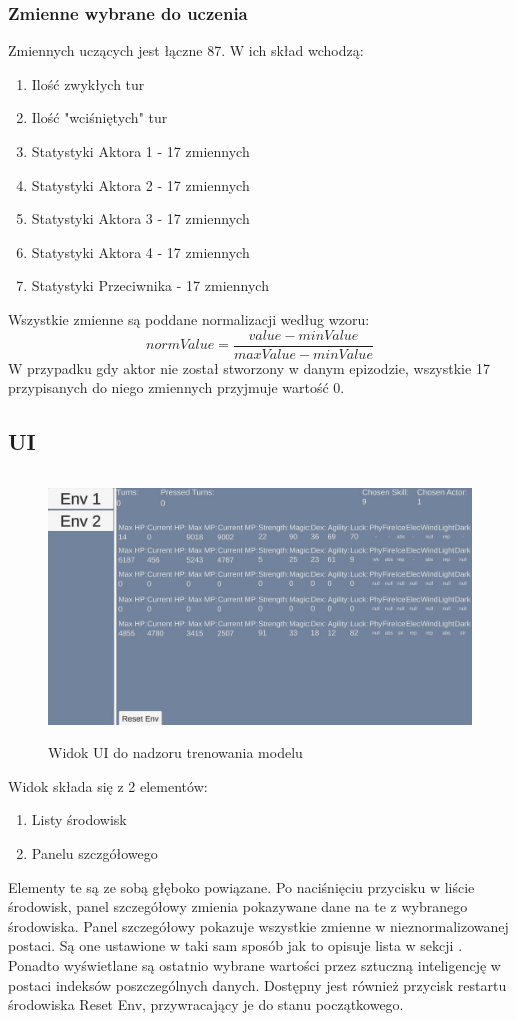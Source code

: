 \documentclass{SGGW-thesis}
\begin{document}
\subsubsection{Zmienne wybrane do uczenia}
\label{zmienne}
Zmiennych uczących jest łączne 87. W ich skład wchodzą:
\begin{enumerate}
  \item{Ilość zwykłych tur}
  \item{Ilość "wciśniętych" tur}
  \item{Statystyki Aktora 1 - 17 zmiennych}
  \item{Statystyki Aktora 2 - 17 zmiennych}
  \item{Statystyki Aktora 3 - 17 zmiennych}
  \item{Statystyki Aktora 4 - 17 zmiennych}
  \item{Statystyki Przeciwnika - 17 zmiennych}
\end{enumerate}
Wszystkie zmienne są poddane normalizacji według wzoru:
\[normValue = \frac{value-minValue}{maxValue-minValue}\]
W przypadku gdy aktor nie został stworzony w danym epizodzie, wszystkie 17 przypisanych do niego zmiennych przyjmuje wartość 0.
\subsection{UI}
\begin{figure}[H]
  \centering
  \includegraphics[height=7cm]{trainingui.JPG}
  \caption{Widok UI do nadzoru trenowania modelu}
\end{figure}
Widok składa się z 2 elementów:
\begin{enumerate}
  \item{Listy środowisk}
  \item{Panelu szczgółowego}
\end{enumerate}
Elementy te są ze sobą głęboko powiązane. Po naciśnięciu przycisku w liście środowisk, panel szczegółowy zmienia pokazywane dane na te z wybranego środowiska.
Panel szczegółowy pokazuje wszystkie zmienne w nieznormalizowanej postaci. Są one ustawione w taki sam sposób jak to opisuje lista w sekcji .
Ponadto wyświetlane są ostatnio wybrane wartości przez sztuczną inteligencję w postaci indeksów poszczególnych danych. Dostępny jest również przycisk restartu
środowiska Reset Env, przywracający je do stanu początkowego.
\end{document}
